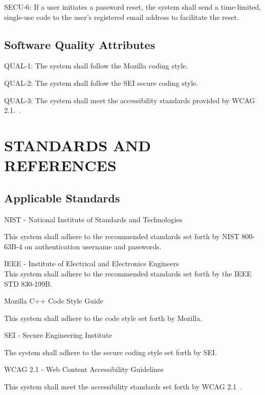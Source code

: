 \documentclass[letterpaper,12pt,oneside,listof=totoc,parskip=full]{scrreprt}
\begin{document}
SECU-6:     If a user initiates a password reset, the system shall send a time-limited, single-use code to the user's registered email address to facilitate the reset.

\section{Software Quality Attributes}

QUAL-1:     The system shall follow the Mozilla coding style.

QUAL-2:     The system shall follow the SEI secure coding style.

QUAL-3:     The system shall meet the accessibility standards provided by WCAG 2.1.~\cite{wcag21}.


\chapter{STANDARDS AND REFERENCES}

\section{Applicable Standards}

NIST - National Institute of Standards and Technologies

This system shall adhere to the recommended standards set forth by NIST 800-63B-4 on authentication username and passwords.~\cite{nist}

IEEE - Institute of Electrical and Electronics Engineers\\
This system shall adhere to the recommended standards set forth by the IEEE STD 830-199B.~\cite{IEEE}

Mozilla C++ Code Style Guide

This system shall adhere to the code style set forth by Mozilla.

SEI - Secure Engineering Institute

The system shall adhere to the secure coding style set forth by SEI.~\cite{sei_cert_cpp}

WCAG 2.1 - Web Content Accessibility Guidelines

This system shall meet the accessibility standards set forth by WCAG 2.1~\cite{wcag21,levelaccess}.

\renewcommand{\bibname}{\section{References}}


\end{document}
